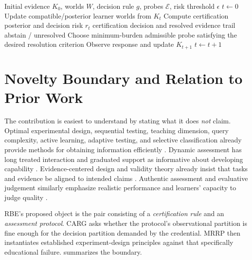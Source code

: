 \documentclass[11pt]{article}
\newcommand{\cE}{\mathcal{E}}
\begin{document}
\begin{algorithm}[t]
\caption{Adaptive Resolution Engine (risk-constrained form). Source: authors' RBE implementation and experiments.}
\label{alg:adaptive}
\begin{algorithmic}[1]
\Require Initial evidence $K_0$, worlds $W$, decision rule $g$, probes $\cE$, risk threshold $\epsilon$
\State $t\gets0$
\Loop
  \State Update compatible/posterior learner worlds from $K_t$
  \State Compute certification posterior and decision risk $r_t$
    \State \Return certification decision and resolved evidence trail
  \EndIf
    \State \Return abstain / unresolved
  \EndIf
  \State Choose minimum-burden admissible probe satisfying the desired resolution criterion
  \State Observe response and update $K_{t+1}$
  \State $t\gets t+1$
\EndLoop
\end{algorithmic}
\end{algorithm}

\section{Novelty Boundary and Relation to Prior Work}
The contribution is easiest to understand by stating what it does \emph{not} claim. Optimal experimental design, sequential testing, teaching dimension, query complexity, active learning, adaptive testing, and selective classification already provide methods for obtaining information efficiently \parencite{wald1947,settles2009,vanderlinden2010,gangrade2021}. Dynamic assessment has long treated interaction and graduated support as informative about developing capability \parencite{allal2000zpd,poehner2011validity}. Evidence-centered design and validity theory already insist that tasks and evidence be aligned to intended claims \parencite{mislevy2003ecd,messick1995validity}. Authentic assessment and evaluative judgement similarly emphasize realistic performance and learners' capacity to judge quality \parencite{gulikers2004authentic,bearman2024evaluative}.

RBE's proposed object is the pair consisting of a \emph{certification rule} and an \emph{assessment protocol}. CARG asks whether the protocol's observational partition is fine enough for the decision partition demanded by the credential. MRRP then instantiates established experiment-design principles against that specifically educational failure.  summarizes the boundary.
\end{document}
